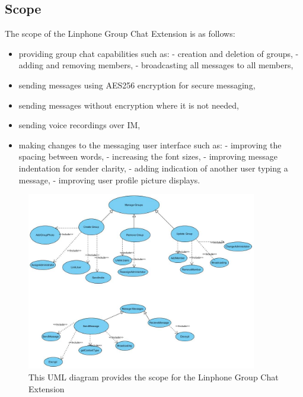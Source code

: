 \documentclass[11pt]{article}
\begin{document}
\subsection{Scope}
The scope of the Linphone Group Chat Extension is as follows:
\begin{itemize}
\item providing group chat capabilities such as:
\subitem  - creation and deletion of groups,
\subitem  - adding and removing members,
\subitem  - broadcasting all messages to all members,
\item sending messages using AES256 encryption for secure messaging,
\item sending messages without encryption where it is not needed,
\item sending voice recordings over IM,
\item making changes to the messaging user interface such as:
\subitem  - improving the spacing between words,
\subitem  - increasing the font sizes,
\subitem  - improving message indentation for sender clarity,
\subitem  - adding indication of another user typing a message,
\subitem  - improving user profile picture displays.
\end{itemize}
\begin{figure}[H]
\centering
\includegraphics[width=380px]{./images/scope.jpg}
\caption[Project Scope]{This UML diagram provides the scope for the Linphone Group Chat Extension}
\label{figure-scope-master}
\end{figure}
\end{document}
